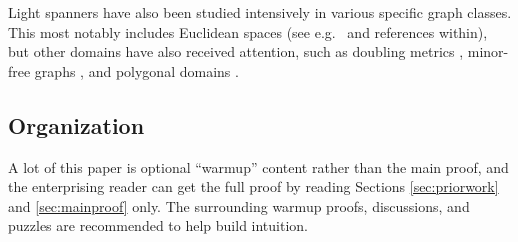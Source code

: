 \documentclass{article}\usepackage[a4paper,margin=20mm]{geometry}
\begin{document}
Light spanners have also been studied intensively in various specific graph classes.
This most notably includes Euclidean spaces (see e.g.\ \cite{FS20, LS23, NS07, ES15} and references within), but other domains have also received attention, such as doubling metrics \cite{KLMS22, LT24, BLW19, CLNS15, CLN15, CG09, GR08}, minor-free graphs \cite{BLW17}, and polygonal domains \cite{BKKLLPT24}.

\subsection{Organization}

A lot of this paper is optional ``warmup'' content rather than the main proof, and the enterprising reader can get the full proof by reading Sections \ref{sec:priorwork} and \ref{sec:mainproof} only.
The surrounding warmup proofs, discussions, and puzzles are recommended to help build intuition.








\end{document}
